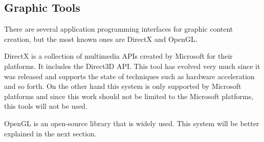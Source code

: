 





%

%

%




\subsection{Graphic Tools} %
\label{sub:graphic_tools}
There are several application programming interfaces for graphic content creation, but the most known ones are DirectX and OpenGL. 

DirectX is a collection of multimedia APIs created by Microsoft for their platforms. It includes the Direct3D API. This tool has evolved very much since it was released and supports the state of techniques such as hardware acceleration and so forth.  On the other hand this system is only supported by Microsoft platforms and since this work should not be limited to the Microsoft platforms, this tools will not be used. 

OpenGL is an open-source library that is widely used. This system will be better explained in the next section.



%
%
%
%





